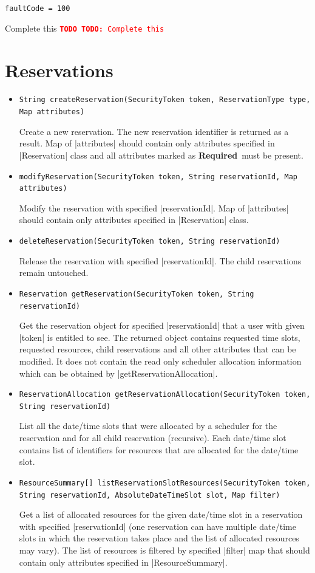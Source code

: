 \documentclass[a4paper]{report}
\newenvironment{Api}{\begin{itemize}}{\end{itemize}}
\newcommand{\ApiCode}[1]{\lstinline[style=styleApi]|#1|}
\newcommand{\ApiItem}[1]{\item #1 %

}
\newcommand{\ApiCmd}[1]{\ApiItem{\ApiCode{#1}}}
\newcommand{\ApiRequired}{{\color{blue!50!black}\textbf{Required}}}
\newenvironment{ApiFailures}{\begin{compactitem}}{\end{compactitem}}
\newcommand{\ApiFailure}[1]{\ApiItem{\ApiCode{faultCode = #1}}}
\newcommand{\TODO}[1]{%
\def\empty{}%
\def\prvniparametr{#1}%
\ifx\prvniparametr\empty%
\begingroup\tt\textcolor{red}{\noindent\textbf{TODO}}\endgroup
\else%
\begingroup\tt\textcolor{red}{\noindent\textbf{TODO:}\ #1}\endgroup
\fi%
}
\begin{document}
\begin{ApiFailures}
\ApiFailure{100}
\end{ApiFailures}
\TODO{Complete this}


\section{Reservations}

\begin{Api}

\ApiCmd{String createReservation(SecurityToken token, ReservationType type, Map attributes)}
Create a new reservation. The new reservation identifier is returned as a result. Map of |attributes| should contain only attributes specified in |Reservation| class and all attributes marked as \ApiRequired\ must be present.

\ApiCmd{modifyReservation(SecurityToken token, String reservationId, Map attributes)}
Modify the reservation with specified |reservationId|. Map of |attributes| should contain only attributes specified in |Reservation| class.

\ApiCmd{deleteReservation(SecurityToken token, String reservationId)}
Release the reservation with specified |reservationId|. The child reservations remain untouched.

\ApiCmd{Reservation getReservation(SecurityToken token, String reservationId)}
Get the reservation object for specified |reservationId| that a user with given |token| is entitled to see. The returned object contains requested time slots, requested resources, child reservations and all other attributes that can be modified. It does not contain the read only scheduler allocation information which can be obtained by |getReservationAllocation|.

\ApiCmd{ReservationAllocation getReservationAllocation(SecurityToken token, String reservationId)}
List all the date/time slots that were allocated by a scheduler for the reservation and for all child reservation (recursive). Each date/time slot contains list of identifiers for resources that are allocated for the date/time slot.

\ApiCmd{ResourceSummary[] listReservationSlotResources(SecurityToken token, String reservationId, AbsoluteDateTimeSlot slot, Map filter)}
Get a list of allocated resources for the given date/time slot in a reservation with specified |reservationId| (one reservation can have multiple date/time slots in which the reservation takes place and the list of allocated resources may vary). The list of resources is filtered by specified |filter| map that should contain only attributes specified in |ResourceSummary|.


\end{Api}
\end{document}
